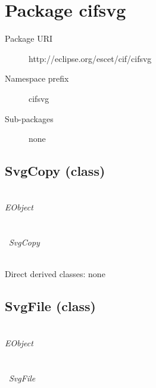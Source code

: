 \section{Package cifsvg}\label{cifpkg:cifsvg}
\pkgdocucifsvg

\begin{description}
\item[Package URI] http://eclipse.org/escet/cif/cifsvg
\item[Namespace prefix] cifsvg
\item[Sub-packages] none
\end{description}

\subsection{SvgCopy (class)}\label{cifclass:SvgCopy}
\clsdocuSvgCopy

~\\ \noindent \emph{EObject} \\
\hook~ \\
\hookindent\hook~ \\
\hookindent\hookindent\hook~\emph{SvgCopy}

~\\ \noindent Direct derived classes:
none

\begin{description}
{\featdocuPositionObjectposition}
{\featdocuSvgCopyid}
{\featdocuSvgCopypost}
{\featdocuSvgCopypre}
{\featdocuSvgCopysvgFile}
\end{description}


\subsection{SvgFile (class)}\label{cifclass:SvgFile}
\clsdocuSvgFile

~\\ \noindent \emph{EObject} \\
\hook~ \\
\hookindent\hook~ \\
\hookindent\hookindent\hook~\emph{SvgFile}

